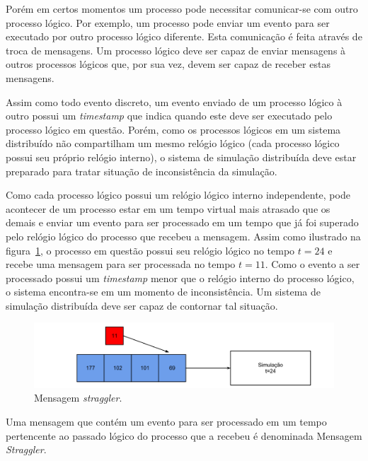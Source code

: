 
Porém em certos momentos um processo pode necessitar comunicar-se com outro processo lógico. Por exemplo, um processo pode enviar um evento para ser executado por outro processo lógico diferente. Esta comunicação é feita através de troca de mensagens. Um processo lógico deve ser capaz de enviar mensagens à outros processos lógicos que, por sua vez, devem ser capaz de receber estas mensagens. 


Assim como todo evento discreto, um evento enviado de um processo lógico à outro possui um \textit{timestamp} que indica quando este deve ser executado pelo processo lógico em questão. Porém, como os processos lógicos em um sistema distribuído não compartilham um mesmo relógio lógico (cada processo lógico possui seu próprio relógio interno), o sistema de simulação distribuída deve estar preparado para tratar situação de inconsistência da simulação.

Como cada processo lógico possui um relógio lógico interno independente, pode acontecer de um processo estar em um tempo virtual mais atrasado que os demais e enviar um evento para ser processado em um tempo que já foi superado pelo relógio lógico do processo que recebeu a mensagem. Assim como ilustrado na figura~\ref{fig:strag}, o processo em questão possui seu relógio lógico no tempo $t=24$ e recebe uma mensagem para ser processada no tempo $t=11$. Como o evento a ser processado possui um \textit{timestamp} menor que o relógio interno do processo lógico, o sistema encontra-se em um momento de inconsistência. Um sistema de simulação distribuída deve ser capaz de contornar tal situação.

\begin{figure}
  \centerline{\includegraphics[scale=0.4]{straggler.png}}
  \caption{Mensagem \textit{straggler}.}
\label{fig:strag}
\end{figure}

Uma mensagem que contém um evento para ser processado em um tempo pertencente ao passado lógico do processo que a recebeu é denominada Mensagem \textit{Straggler}.

